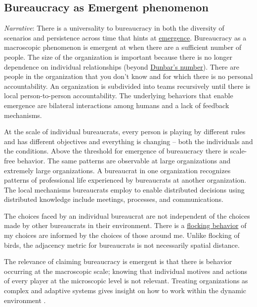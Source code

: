 

\subsection{Bureaucracy as Emergent phenomenon}

\textit{Narrative}: There is a universality to bureaucracy in both the diversity of scenarios and persistence across time that hints at \href{https://en.wikipedia.org/wiki/Emergence}{emergence}. Bureaucracy as a macroscopic phenomenon is emergent at when there are a sufficient number of people. The size of the organization is important because there is no longer dependence on individual relationships (beyond \href{https://en.wikipedia.org/wiki/Dunbar\%27s_number}{Dunbar's number}). There are people in the organization that you don't know and for which there is no personal accountability. An organization is subdivided into teams recursively until there is local person-to-person accountability.  The underlying behaviors that enable emergence are bilateral interactions among humans and a lack of feedback mechanisms. 

At the scale of individual bureaucrats, every person is playing by different rules and has different objectives and everything is changing -- both the individuals and the conditions. 
Above the threshold for emergence of bureaucracy there is scale-free behavior. The same patterns are observable at large organizations and extremely large organizations. A bureaucrat in one organization recognizes patterns of professional life experienced by bureaucrats at another organization. The local mechanisms bureaucrats employ to enable distributed decisions using distributed knowledge include meetings, processes, and communications. 

The choices faced by an individual bureaucrat are not independent of the choices made by other bureaucrats in their environment. There is a \href{https://en.wikipedia.org/wiki/Flocking_(behavior)}{flocking behavior} of my choices are informed by the choices of those around me. Unlike flocking of birds, the adjacency metric for bureaucrats is not necessarily spatial distance.


The relevance of claiming bureaucracy is emergent is that there is behavior occurring at the macroscopic scale; knowing that individual motives and actions of every player at the microscopic level is not relevant. Treating organizations as complex and adaptive systems gives insight on how to work within the dynamic environment \cite{2011_Eisenhardt}.


